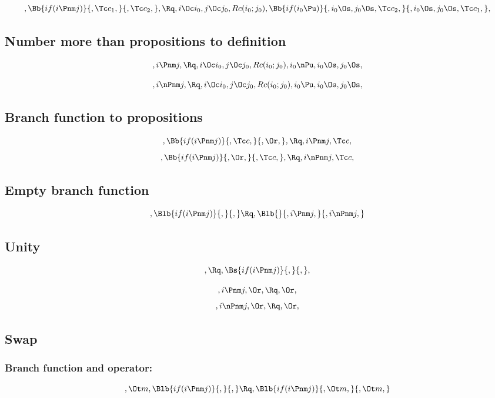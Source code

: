 \[,\Bb{if(i \Pnm j)}{, \Tc c_1,}{, \Tc c_2,}, \Rq , i \Oc i_0, j \Oc j_0, Rc(i_0; j_0), \Bb{if(i_0 \Pu)}{,i_0 \Os, j_0 \Os, \Tc c_2, }{, i_0 \Os, j_0 \Os, \Tc c_1,}, \]





\bigskip
\bigskip
\subsection{Number more than propositions to definition}
\[,i \Pnm j, \Rq ,  i \Oc i_0, j \Oc j_0, Rc(i_0; j_0), i_0 \nPu, i_0 \Os, j_0 \Os,\]




\[,i \nPnm j, \Rq ,  i \Oc i_0, j \Oc j_0, Rc(i_0; j_0), i_0 \Pu, i_0 \Os, j_0 \Os,\]




\subsection{Branch function to propositions}
\[,\Bb{if(i \Pnm j)}{,\Tc c,}{,\Or,}, \Rq ,i \Pnm j, \Tc c,\]
\bigskip
\bigskip
\[,\Bb{if(i \Pnm j)}{,\Or,}{,\Tc c,}, \Rq ,i \nPnm j, \Tc c,\]
\bigskip
\bigskip






\subsection{Empty branch function} 
\[, \Blb{if(i \Pnm j)}{,}{,} \Rq , \Blb{}{, i \Pnm j,}{, i \nPnm j,}\]







\subsection{ Unity}
\[, \Rq , \Bs{if(i \Pnm j)}{,}{,},\]




\[, i \Pnm j, \Or, \Rq , \Or,\]
\[, i \nPnm j, \Or, \Rq , \Or,\]









\bigskip
\bigskip
\bigskip
\bigskip
\subsection{ Swap}
\subsubsection{Branch function and operator:}
\[,\Ot m, \Blb{if(i \Pnm j)}{,}{,} \Rq , \Blb{if(i \Pnm j)}{,\Ot m,}{,\Ot m,}\]


